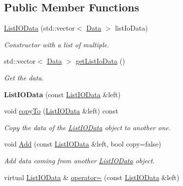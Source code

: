\subsection*{Public Member Functions}
\begin{DoxyCompactItemize}
\item 
\hyperlink{classfilter_1_1data_1_1_list_i_o_data_a60486a441c50cb2e16386fdb7310c901}{List\+I\+O\+Data} (std\+::vector$<$ \hyperlink{classfilter_1_1data_1_1_data}{Data} $>$ list\+Io\+Data)
\begin{DoxyCompactList}\small\item\em Constructor with a list of multiple. \end{DoxyCompactList}\item 
std\+::vector$<$ \hyperlink{classfilter_1_1data_1_1_data}{Data} $>$ \hyperlink{classfilter_1_1data_1_1_list_i_o_data_a861011cdf036244dfab132bc024f8971}{get\+List\+Io\+Data} ()
\begin{DoxyCompactList}\small\item\em Get the data. \end{DoxyCompactList}\item 
\mbox{\label{classfilter_1_1data_1_1_list_i_o_data_a38807e4e5651a03400f525cb399e84c7}} 
{\bfseries List\+I\+O\+Data} (const \hyperlink{classfilter_1_1data_1_1_list_i_o_data}{List\+I\+O\+Data} \&left)
\item 
void \hyperlink{classfilter_1_1data_1_1_list_i_o_data_a1e56236e33f0389b74ad287a209e0829}{copy\+To} (\hyperlink{classfilter_1_1data_1_1_list_i_o_data}{List\+I\+O\+Data} \&left) const
\begin{DoxyCompactList}\small\item\em Copy the data of the \hyperlink{classfilter_1_1data_1_1_list_i_o_data}{List\+I\+O\+Data} object to another one. \end{DoxyCompactList}\item 
void \hyperlink{classfilter_1_1data_1_1_list_i_o_data_a353fa855f51b511b3afa53f2dac6e0f3}{Add} (const \hyperlink{classfilter_1_1data_1_1_list_i_o_data}{List\+I\+O\+Data} \&left, bool copy=false)
\begin{DoxyCompactList}\small\item\em Add data coming from another \hyperlink{classfilter_1_1data_1_1_list_i_o_data}{List\+I\+O\+Data} object. \end{DoxyCompactList}\item 
virtual \hyperlink{classfilter_1_1data_1_1_list_i_o_data}{List\+I\+O\+Data} \& \hyperlink{classfilter_1_1data_1_1_list_i_o_data_a0c5040ca622f5eacc9bdc03bb609e5e9}{operator=} (const \hyperlink{classfilter_1_1data_1_1_list_i_o_data}{List\+I\+O\+Data} \&left)

\end{DoxyCompactItemize}
